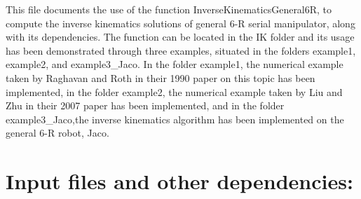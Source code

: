This file documents the use of the function \textquotesingle{}Inverse\+Kinematics\+General6R\textquotesingle{}, to compute the inverse kinematics solutions of general 6-\/R serial manipulator, along with its dependencies. The function can be located in the \textquotesingle{}IK\textquotesingle{} folder and its usage has been demonstrated through three examples, situated in the folders \textquotesingle{}example1\textquotesingle{}, \textquotesingle{}example2\textquotesingle{}, and \textquotesingle{}example3\+\_\+\+Jaco\textquotesingle{}. In the folder \textquotesingle{}example1\textquotesingle{}, the numerical example taken by \textquotesingle{}Raghavan and Roth\textquotesingle{} in their 1990 paper on this topic has been implemented, in the folder \textquotesingle{}example2\textquotesingle{}, the numerical example taken by \textquotesingle{}Liu and Zhu\textquotesingle{} in their 2007 paper has been implemented, and in the folder \textquotesingle{}example3\+\_\+\+Jaco\textquotesingle{},the inverse kinematics algorithm has been implemented on the general 6-\/R robot, Jaco.\hypertarget{index_input}{}\section{Input files and other dependencies\+:}\label{index_input}
